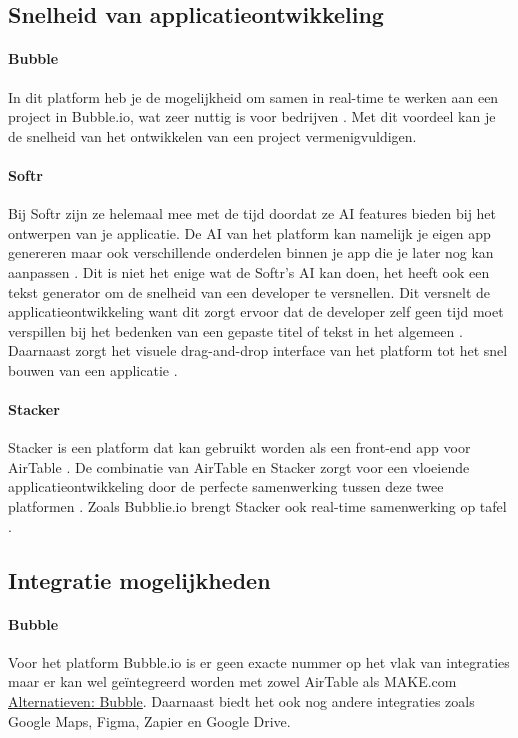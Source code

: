 \subsection{Snelheid van applicatieontwikkeling}%
\label{subsec:snelheid-van-applicatieontwikkeling}
\paragraph{Bubble}
In dit platform heb je de mogelijkheid om samen in real-time te werken aan een project in Bubble.io, wat zeer nuttig is voor bedrijven \autocite{Bubble2024b}. 
Met dit voordeel kan je de snelheid van het ontwikkelen van een project vermenigvuldigen.
\paragraph{Softr}
Bij Softr zijn ze helemaal mee met de tijd doordat ze AI features bieden bij het ontwerpen van je applicatie. 
De AI van het platform kan namelijk je eigen app genereren maar ook verschillende onderdelen binnen je app 
die je later nog kan aanpassen \autocite{Frater2024}. Dit is niet het enige wat de Softr’s 
AI kan doen, het heeft ook een tekst generator om de snelheid van een developer te versnellen. 
Dit versnelt de applicatieontwikkeling want dit zorgt ervoor dat de developer zelf geen 
tijd moet verspillen bij het bedenken van een gepaste titel of tekst in het algemeen \autocite{Frater2024}. 
Daarnaast zorgt het visuele drag-and-drop interface van het platform tot het snel bouwen van een applicatie \autocite{Code2023}. 
\paragraph{Stacker}
Stacker is een platform dat kan gebruikt worden als een front-end app voor AirTable \autocite{Advice}. 
De combinatie van AirTable en Stacker zorgt voor een vloeiende applicatieontwikkeling door de perfecte samenwerking tussen deze twee platformen \autocite{Advice}. 
Zoals Bubblie.io brengt Stacker ook real-time samenwerking op tafel \autocite{Allen2020}.
\subsection*{Integratie mogelijkheden}%
\label{subsec:integratie-mogelijkheden}
\paragraph{Bubble}
Voor het platform Bubble.io is er geen exacte nummer op het vlak van integraties maar er kan wel geïntegreerd worden met zowel AirTable als MAKE.com \hyperref[subsec:alternatieve-platformen]{Alternatieven: Bubble}. 
Daarnaast biedt het ook nog andere integraties zoals Google Maps, Figma, Zapier en Google Drive.
